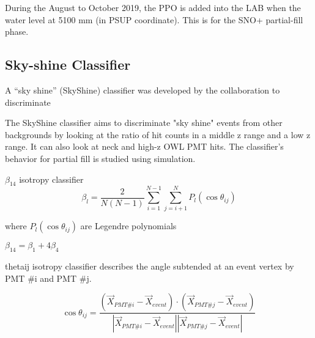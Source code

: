 

During the August to October 2019, the PPO is added into the LAB when the water level at 5100 mm (in PSUP coordinate). This is for the SNO+ partial-fill phase.


\subsection{Sky-shine Classifier}
A ``sky shine'' (SkyShine) classifier was developed by the collaboration to discriminate 


The SkyShine classifier aims to discriminate "sky shine" events from other backgrounds by looking at the ratio of hit counts in a middle z range and a low z range. It can also look at neck and high-z OWL PMT hits. The classifier's behavior for partial fill is studied using simulation.

\cite{skyshine}


$\beta_{14}$ isotropy classifier
\[
\beta_l = \frac{2}{N(N-1)}\sum_{i=1}^{N-1}\sum_{j=i+1}^N P_l(\cos\theta_{ij})
\]

where $P_l(\cos\theta_{ij})$ are Legendre polynomials

$\beta_{14}=\beta_1+4\beta_4$


thetaij isotropy classifier describes the angle subtended at an event vertex by PMT \#i and PMT \#j.

\[
\cos\theta_{ij}=\frac{(\vec{X}_{PMT\#i}- \vec{X}_{event})\cdot (\vec{X}_{PMT\#j}- \vec{X}_{event})}{|\vec{X}_{PMT\#i}- \vec{X}_{event}||\vec{X}_{PMT\#j}- \vec{X}_{event}|}
\]